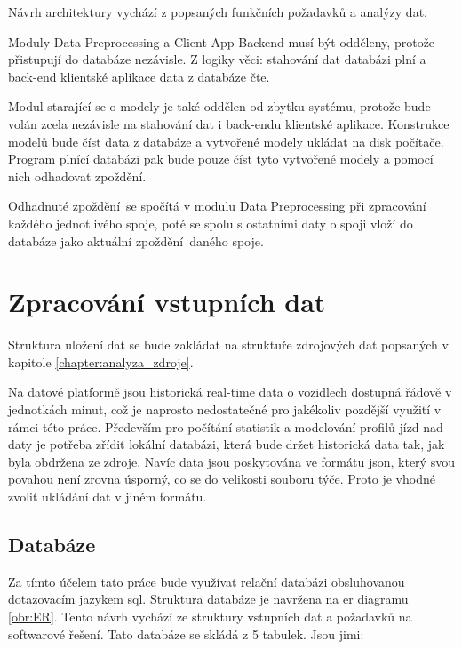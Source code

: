 \bigbreak


Návrh architektury vychází z popsaných funkčních požadavků a analýzy dat.


\bigbreak


Moduly Data Preprocessing a Client App Backend musí být odděleny, protože přistupují do databáze nezávisle. Z logiky věci: stahování dat databázi plní a back-end klientské aplikace data z databáze čte.


\bigbreak


Modul starající se o modely je také oddělen od zbytku systému, protože bude volán zcela nezávisle na stahování dat i back-endu klientské aplikace. Konstrukce modelů bude číst data z databáze a vytvořené modely ukládat na disk počítače. Program plnící databázi pak bude pouze číst tyto vytvořené modely a pomocí nich odhadovat zpoždění.

\bigbreak

Odhadnuté zpoždění se spočítá v modulu Data Preprocessing při zpracování každého jednotlivého spoje, poté se spolu s ostatními daty o spoji vloží do databáze jako aktuální zpoždění daného spoje.


\section{Zpracování vstupních dat} \label{section:zpracovani_vstupnich_dat}


Struktura uložení dat se bude zakládat na struktuře zdrojových dat popsaných v kapitole \ref{chapter:analyza_zdroje}.


\bigbreak


Na datové platformě jsou historická real-time data o vozidlech dostupná řádově v jednotkách minut, což je naprosto nedostatečné pro jakékoliv pozdější využití v rámci této práce. Především pro počítání statistik a modelování profilů jízd nad daty je potřeba zřídit lokální databázi, která bude držet historická data tak, jak byla obdržena ze zdroje. Navíc data jsou poskytována ve formátu \gls{json}, který svou povahou není zrovna úsporný, co se do velikosti souboru týče. Proto je vhodné zvolit ukládání dat v jiném formátu.


\subsection{Databáze} \label{subsection:databaze}

Za tímto účelem tato práce bude využívat relační databázi obsluhovanou dotazovacím jazykem \gls{sql}. Struktura databáze je navržena na \gls{er} diagramu \ref{obr:ER}. Tento návrh vychází ze struktury vstupních dat a požadavků na softwarové řešení. Tato databáze se skládá z 5 tabulek. Jsou jimi:


